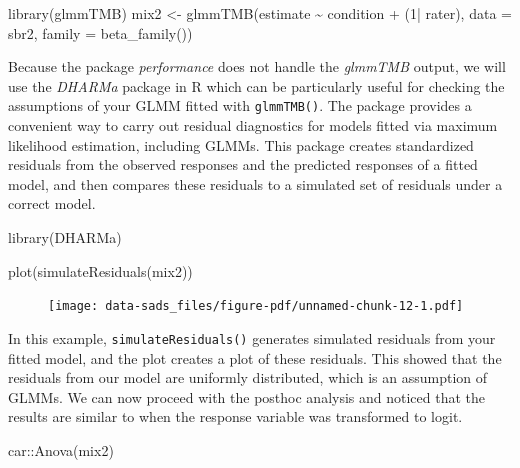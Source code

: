 \documentclass[
  letterpaper,
]{book}
\newenvironment{Shaded}{\begin{snugshade}}{\end{snugshade}}
\newcommand{\AttributeTok}[1]{\textcolor[rgb]{0.40,0.45,0.13}{#1}}
\newcommand{\DecValTok}[1]{\textcolor[rgb]{0.68,0.00,0.00}{#1}}
\newcommand{\FunctionTok}[1]{\textcolor[rgb]{0.28,0.35,0.67}{#1}}
\newcommand{\NormalTok}[1]{\textcolor[rgb]{0.00,0.23,0.31}{#1}}
\newcommand{\OtherTok}[1]{\textcolor[rgb]{0.00,0.23,0.31}{#1}}
\newcommand{\SpecialCharTok}[1]{\textcolor[rgb]{0.37,0.37,0.37}{#1}}
\begin{document}
\begin{Shaded}
\begin{Highlighting}[]
\FunctionTok{library}\NormalTok{(glmmTMB)}
\NormalTok{mix2 }\OtherTok{\textless{}{-}}  \FunctionTok{glmmTMB}\NormalTok{(estimate }\SpecialCharTok{\textasciitilde{}}\NormalTok{ condition }\SpecialCharTok{+}\NormalTok{ (}\DecValTok{1}\SpecialCharTok{|}\NormalTok{ rater), }
                 \AttributeTok{data =}\NormalTok{ sbr2, }
                 \AttributeTok{family =} \FunctionTok{beta\_family}\NormalTok{())}
\end{Highlighting}
\end{Shaded}

Because the package \emph{performance} does not handle the
\emph{glmmTMB} output, we will use the \emph{DHARMa} package in R which
can be particularly useful for checking the assumptions of your GLMM
fitted with \texttt{glmmTMB()}. The package provides a convenient way to
carry out residual diagnostics for models fitted via maximum likelihood
estimation, including GLMMs. This package creates standardized residuals
from the observed responses and the predicted responses of a fitted
model, and then compares these residuals to a simulated set of residuals
under a correct model.

\begin{Shaded}
\begin{Highlighting}[]
\FunctionTok{library}\NormalTok{(DHARMa)}

\FunctionTok{plot}\NormalTok{(}\FunctionTok{simulateResiduals}\NormalTok{(mix2))}
\end{Highlighting}
\end{Shaded}

\begin{figure}[H]

{\centering \texttt{[image: data-sads\_files/figure-pdf/unnamed-chunk-12-1.pdf]}

}

\end{figure}

In this example, \texttt{simulateResiduals()} generates simulated
residuals from your fitted model, and the plot creates a plot of these
residuals. This showed that the residuals from our model are uniformly
distributed, which is an assumption of GLMMs. We can now proceed with
the posthoc analysis and noticed that the results are similar to when
the response variable was transformed to logit.

\begin{Shaded}
\begin{Highlighting}[]
\NormalTok{car}\SpecialCharTok{::}\FunctionTok{Anova}\NormalTok{(mix2)}
\end{Highlighting}
\end{Shaded}
\end{document}
